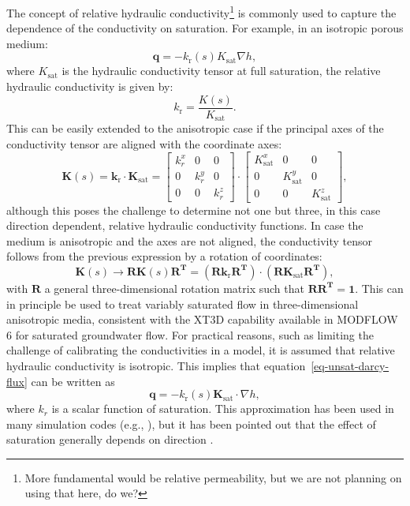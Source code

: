 \documentclass[fleqn]{article}
\begin{document}
The concept of relative hydraulic conductivity\footnote{More fundamental would
  be relative permeability, but we are not planning on using that here, do we?}
is commonly used to capture the dependence of the conductivity on saturation. 
For example, in an isotropic porous medium:
\begin{equation}
  \mathbf{q} = - k_\textrm{r}(s) K_{\textrm{sat}} \nabla h,
\end{equation}
where $K_\textrm{sat}$ is the hydraulic conductivity tensor at full saturation,
the relative hydraulic conductivity is given by:
\begin{equation}
  k_\textrm{r} = \frac{K(s)}{K_{\textrm{sat}}}.
\end{equation}
This can be easily extended to the anisotropic case if the principal axes
of the conductivity tensor are aligned with the coordinate axes:
\begin{equation}
  \mathbf{K}(s) = \mathbf{k}_{\textrm{r}} \cdot \mathbf{K}_{\textrm{sat}}
  = 
  \begin{bmatrix}
    k_r^x & 0     & 0     \\
    0     & k_r^y & 0     \\
    0     & 0     & k_r^z
  \end{bmatrix} \cdot
  \begin{bmatrix}
    K_{\text{sat}}^x & 0                & 0                \\
    0                & K_{\text{sat}}^y & 0                \\
    0                & 0                & K_{\text{sat}}^z
  \end{bmatrix},
\end{equation}
although this poses the challenge to determine not one but three, in
this case direction dependent, relative hydraulic conductivity functions. In case the 
medium is anisotropic and the axes are not aligned, the conductivity tensor
follows from the previous expression by a rotation of coordinates:
\begin{equation}
  \mathbf{K}(s) \rightarrow \mathbf{R} \mathbf{K}(s) \mathbf{R^T}
  = (\mathbf{R} \mathbf{k}_{\textrm{r}} \mathbf{R^T}) \cdot 
  (\mathbf{R} \mathbf{K}_{\textrm{sat}} \mathbf{R^T}),
\end{equation}
with $\mathbf{R}$ a general three-dimensional rotation matrix such that
$\mathbf{R}\mathbf{R^T} = \mathbf{1}$. This can in principle be used
to treat variably saturated flow in three-dimensional anisotropic media,
consistent with the XT3D capability \cite{modflow6xt3d} available in
MODFLOW 6 for saturated groundwater flow. For practical reasons, such
as limiting the challenge of calibrating the conductivities in a model,
it is assumed that relative hydraulic conductivity is isotropic. This
implies that equation~\ref{eq-unsat-darcy-flux} can be written as
\begin{equation}
  \mathbf{q} = - k_\text{r}(s) \mathbf{K}_{\textrm{sat}} \cdot \nabla h,
\end{equation}
where $k_r$ is a scalar function of saturation. This approximation
has been used in many simulation codes 
(e.g., \cite{vs2d,modflowvsf,vosssutra,panday-surfact}), but it has been
pointed out that the effect of saturation generally depends on 
direction \cite{bear-1987}.
\end{document}

